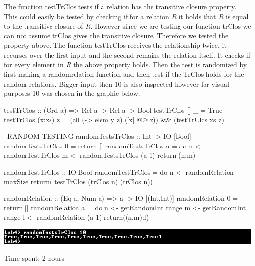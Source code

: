 \documentclass{article}
\begin{document}
The function testTrClos tests if a relation has the transitive closure property. This could easily be tested by checking if for a relation {\em R} it holds that
 {\em R} is equal to the transitive closure of  {\em R}. However since we are testing our function trClos we can not assume trClos gives the transitive closure. Therefore we tested the property above. The function testTrClos receives the relationship twice, it recurses over the first input and the second remains the relation itself. It checks if for every element in  {\em R} the above property holds. Then the test is randomized by first making a randomrelation function and then test if the TrClos holds for the random relations. Bigger input then 10 is also inspected however for visual purposes 10 was chosen in the graphic below.

\begin{code}
testTrClos :: (Ord a) => Rel a -> Rel a -> Bool
testTrClos [] _ = True
testTrClos (x:xs) z = (all (\y -> elem y z) ([x] @@ z)) && (testTrClos xs z)

--RANDOM TESTING
randomTestsTrClos :: Int -> IO [Bool]
randomTestsTrClos 0 = return []
randomTestsTrClos a = do 	n <- randomTestTrClos
				m <- randomTestsTrClos (a-1)
				return (n:m)

randomTestTrClos :: IO Bool
randomTestTrClos = do 	n <- randomRelation maxSize
			return( testTrClos (trClos n) (trClos n)) 

randomRelation :: (Eq a, Num a) => a -> IO [(Int,Int)]
randomRelation 0 = return []
randomRelation a = do 	n <- getRandomInt range
			m <- getRandomInt range
			l <- randomRelation (a-1)
			return((n,m):l) 

\end{code}

\includegraphics{knipsel2}

Time spent: 2 hours
\end{document}
